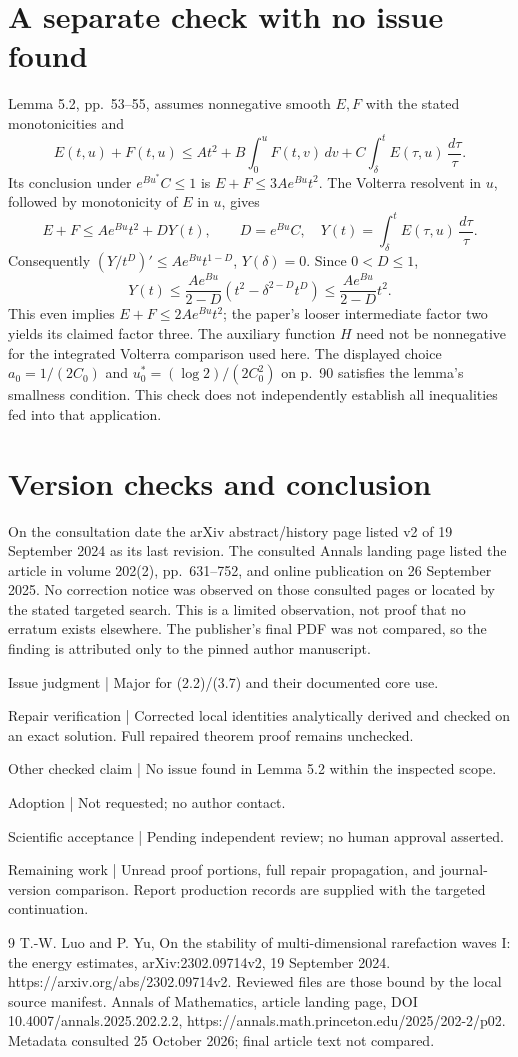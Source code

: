 \documentclass[10pt]{article}
\begin{document}
\section*{A separate check with no issue found}
Lemma 5.2, pp. 53–55, assumes nonnegative smooth \(E,F\) with the stated monotonicities and \[E(t,u)+F(t,u)\leq At^2+B\int_0^uF(t,v)\,dv
+C\int_\delta^t E(\tau,u)\,\frac{d\tau}{\tau}.\] Its conclusion under \(e^{Bu^*}C\leq1\) is \(E+F\leq3Ae^{Bu}t^2\). The Volterra resolvent in \(u\), followed by monotonicity of \(E\) in \(u\), gives \[E+F\leq Ae^{Bu}t^2+D Y(t),\qquad
D=e^{Bu}C,\quad Y(t)=\int_\delta^t E(\tau,u)\,\frac{d\tau}{\tau}.\] Consequently \((Y/t^D)'\leq Ae^{Bu}t^{1-D}\), \(Y(\delta)=0\). Since \(0<D\leq1\), \[Y(t)\leq\frac{Ae^{Bu}}{2-D}
  (t^2-\delta^{2-D}t^D)
\leq\frac{Ae^{Bu}}{2-D}t^2 .\] This even implies \(E+F\leq2Ae^{Bu}t^2\); the paper’s looser intermediate factor two yields its claimed factor three. The auxiliary function \(H\) need not be nonnegative for the integrated Volterra comparison used here. The displayed choice \(a_0=1/(2C_0)\) and \(u_0^*=(\log2)/(2C_0^2)\) on p. 90 satisfies the lemma’s smallness condition. This check does not independently establish all inequalities fed into that application.\par
\section*{Version checks and conclusion}
On the consultation date the arXiv abstract/history page listed v2 of 19 September 2024 as its last revision. The consulted Annals landing page listed the article in volume 202(2), pp. 631–752, and online publication on 26 September 2025. No correction notice was observed on those consulted pages or located by the stated targeted search. This is a limited observation, not proof that no erratum exists elsewhere. The publisher’s final PDF was not compared, so the finding is attributed only to the pinned author manuscript.\par
Issue judgment | Major for (2.2)/(3.7) and their documented core use.\par
Repair verification | Corrected local identities analytically derived and checked on an exact solution. Full repaired theorem proof remains unchecked.\par
Other checked claim | No issue found in Lemma 5.2 within the inspected scope.\par
Adoption | Not requested; no author contact.\par
Scientific acceptance | Pending independent review; no human approval asserted.\par
Remaining work | Unread proof portions, full repair propagation, and journal-version comparison. Report production records are supplied with the targeted continuation.\par
9 T.-W. Luo and P. Yu, On the stability of multi-dimensional rarefaction waves I: the energy estimates, arXiv:2302.09714v2, 19 September 2024. https://arxiv.org/abs/2302.09714v2. Reviewed files are those bound by the local source manifest. Annals of Mathematics, article landing page, DOI 10.4007/annals.2025.202.2.2, https://annals.math.princeton.edu/2025/202-2/p02. Metadata consulted 25 October 2026; final article text not compared.\par
\end{document}
